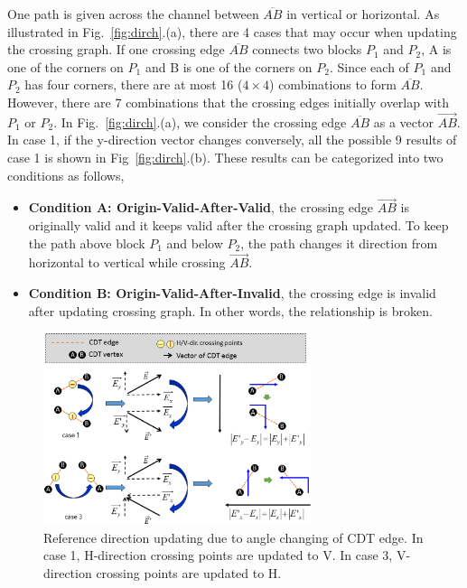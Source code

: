        
      One path is given across the channel between $\overline{AB}$ in vertical or horizontal. As illustrated in Fig.~\ref{fig:dirch}.(a), there are 4 cases that may occur when updating the crossing graph. If one crossing edge $\overline{AB}$ connects two blocks $P_1$ and $P_2$, A is one of the corners on $P_1$ and B is one of the corners on $P_2$. Since each of $P_1$ and $P_2$ has four corners, there are at most 16 ($4\times 4$) combinations to form $\overline{AB}$. However, there are 7 combinations that the crossing edges initially overlap with $P_1$ or $P_2$. In Fig.~\ref{fig:dirch}.(a), we consider the crossing edge $\overline{AB}$ as a vector $\overrightarrow{AB}$. In case 1, if the y-direction vector changes conversely, all the possible 9 results of case 1 is shown in Fig~\ref{fig:dirch}.(b). These results can be categorized into two conditions as follows,
      \begin{itemize}
        \item{\bf Condition A: Origin-Valid-After-Valid}, the crossing edge $\overrightarrow{AB}$ is originally valid and it keeps valid after the crossing graph updated. To keep the path above block $P_1$ and below $P_2$, the path changes it direction from horizontal to vertical while crossing $\overrightarrow{AB}$.
        \item{\bf Condition B: Origin-Valid-After-Invalid}, the crossing edge is invalid after updating crossing graph. In other words, the relationship is broken.
      \end{itemize}

      \begin{figure}[t]
        \begin{center}
          \includegraphics[width=0.7\textwidth]{Fig/Chapter4/refdir3.eps}
          \caption{Reference direction updating due to angle changing of CDT edge.
           In case 1, H-direction crossing points are updated to V. 
             In case 3, V-direction crossing points are updated to H.}
          \label{fig:refdir}
        \end{center}
      \end{figure}

